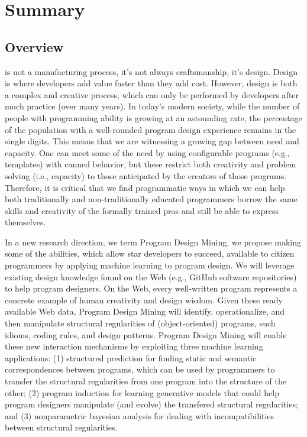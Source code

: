 \chapter{Summary}{}
\label{sec:intro}

\section*{Overview} %
\label{sec:overview}
             
 is not a manufacturing process, it's not 
always craftsmanship, it's design. Design is where developers add 
value faster than they add cost. However, design is both a complex 
and creative process, which can only be performed by developers after 
much practice (over many years). In today’s modern society, while the 
number of people with programming ability is growing at an astounding 
rate, the percentage of the population with a well-rounded program 
design experience remains in the single digits. This means that we are 
witnessing a growing gap between need and capacity. One can meet some of 
the need by using configurable programs (e.g., templates) with canned 
behavior, but these restrict both creativity and problem solving 
(i.e., capacity) to those anticipated by the creators of those programs. 
Therefore, it is critical that we find programmatic ways in which we can 
help both traditionally and non-traditionally educated programmers borrow 
the same skills and creativity of the formally trained pros and still 
be able to express themselves.

In a new research direction, we term Program Design Mining, we propose  
making some of the abilities, which allow star developers to succeed, 
available to citizen programmers by applying machine learning to program 
design. We will leverage existing design knowledge found on the Web (e.g., 
GitHub software repositories) to help program designers. On the Web, 
every well-written program represents a concrete example of human 
creativity and design wisdom. Given these ready available Web data, 
Program Design Mining will identify, operationalize, and then manipulate 
structural regularities \cite{minsky1991law} of (object-oriented) programs, 
such idioms, coding rules, and design patterns. Program Design Mining 
will enable these new interaction mechanisms by exploiting three 
machine learning applications: (1) structured prediction 
\cite{collins2002discriminative} for finding static and semantic correspondences 
between programs, which can be used by programmers to transfer the structural 
regularities from one program into the structure of the other; (2) program 
induction \cite{lake2015human} for learning generative models that could help 
program designers manipulate (and evolve) the transfered structural regularities; 
and (3) nonparametric bayesian analysis \cite{allamanis2014mining} for dealing 
with incompatibilities between structural regularities.

